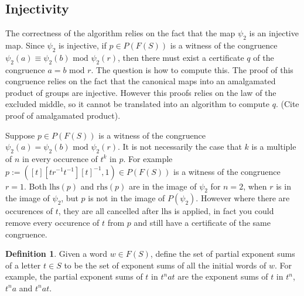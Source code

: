 \documentclass[11pt]{article} %
\theoremstyle{definition}
\theoremstyle{definition}
\theoremstyle{definition}
\theoremstyle{definition}
\theoremstyle{definition}
\newtheorem{defn}[theorem]{Definition}
\theoremstyle{definition}
\begin{document}



\subsection{Injectivity}\label{powproof}

The correctness of the algorithm relies on the fact that the map $\psi_2$ is an injective map.
Since $\psi_2$ is injective, if $p \in P(F(S))$ is a witness of the congruence
$\psi_2(a) \equiv \psi_2(b) \text{ mod } \psi_2(r)$, then there must exist a certificate
$q$ of the congruence $a = b \text{ mod }r$. The question is how to compute this. The proof
of this congruence relies on the fact that the canonical maps into an amalgamated product
of groups are injective. However this proofs relies on the law of the excluded middle, so
it cannot be translated into an algorithm to compute $q$. (Cite proof of amalgamated product).

Suppose $p \in P(F(S))$ is a witness of the congruence
$\psi_2(a) = \psi_2(b) \text{ mod } \psi_2(r)$. It is not necessarily the case that $k$
is a multiple of $n$ in every occurence of $t^k$ in $p$. For example
$p := ([t][tr^{-1}t^{-1}][t]^{-1}, 1) \in P(F(S))$ is a witness of the congruence
$r = 1$. Both $\text{lhs}(p)$ and $\text{rhs}(p)$ are in the image of
$\psi_2$ for $n = 2$, when $r$ is in the image of $\psi_2$,
but $p$ is not in the image of $P(\psi_2)$. However where there are
occurences of $t$, they are all cancelled after $\text{lhs}$ is applied, in fact
you could remove every occurence of $t$ from $p$ and still have a certificate of the same
congruence.

\begin{defn}
  Given a word $w \in F(S)$, define the set of partial exponent sums of a letter $t \in S$ to
  be the set of exponent sums of all the initial words of $w$. For example, the partial
  exponent sums of $t$ in $t^n a t$ are the exponent sums of $t$ in
  $t^n$, $t^na$ and $t^nat$.
\end{defn}
\end{document}
